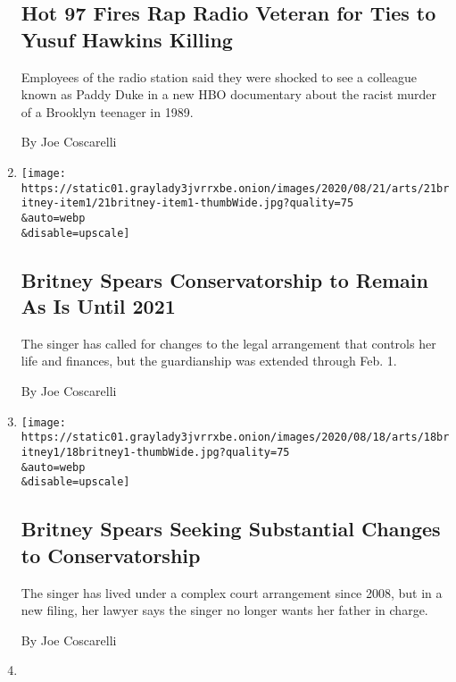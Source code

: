 \begin{enumerate}
{  \subsection{Hot 97 Fires Rap Radio Veteran for Ties to Yusuf Hawkins
  Killing}\label{hot-97-fires-rap-radio-veteran-for-ties-to-yusuf-hawkins-killing}}

  Employees of the radio station said they were shocked to see a
  colleague known as Paddy Duke in a new HBO documentary about the
  racist murder of a Brooklyn teenager in 1989.

  By Joe Coscarelli
\item
  \href{/2020/08/21/arts/music/britney-spears-conservatorship.html}{}

  \texttt{[image: https://static01.graylady3jvrrxbe.onion/images/2020/08/21/arts/21britney-item1/21britney-item1-thumbWide.jpg?quality=75\\\&auto=webp\\\&disable=upscale]}

  \hypertarget{britney-spears-conservatorship-to-remain-as-is-until-2021}{%
  \subsection{Britney Spears Conservatorship to Remain As Is Until
  2021}\label{britney-spears-conservatorship-to-remain-as-is-until-2021}}

  The singer has called for changes to the legal arrangement that
  controls her life and finances, but the guardianship was extended
  through Feb. 1.

  By Joe Coscarelli
\item
  \href{/2020/08/18/arts/music/britney-spears-conservatorship.html}{}

  \texttt{[image: https://static01.graylady3jvrrxbe.onion/images/2020/08/18/arts/18britney1/18britney1-thumbWide.jpg?quality=75\\\&auto=webp\\\&disable=upscale]}

  \hypertarget{britney-spears-seeking-substantial-changes-to-conservatorship}{%
  \subsection{Britney Spears Seeking Substantial Changes to
  Conservatorship}\label{britney-spears-seeking-substantial-changes-to-conservatorship}}

  The singer has lived under a complex court arrangement since 2008, but
  in a new filing, her lawyer says the singer no longer wants her father
  in charge.

  By Joe Coscarelli
\item
  \href{/2020/08/05/arts/music/takeoff-migos-rape-lawsuit.html}{}


\end{enumerate}
